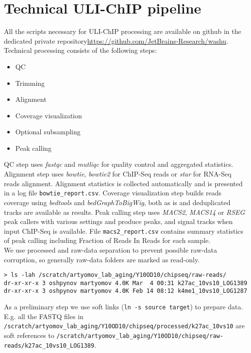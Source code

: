 \documentclass{article}
\begin{document}
\section{Technical ULI-ChIP pipeline}
All the scripts necessary for ULI-ChIP processing are available on github in the dedicated private repository\url{https://github.com/JetBrains-Research/washu}.\\ 
Technical processing consists of the following steps:
\begin{itemize}
\item QC
\item Trimming
\item Alignment
\item Coverage visualization
\item Optional subsampling
\item Peak calling
\end{itemize}
QC step uses \textit{fastqc} and \textit{mutliqc} for quality control and aggregated statistics. Alignment step uses \textit{bowtie}, \textit{bowtie2} for ChIP-Seq reads or \textit{star} for RNA-Seq reads alignment. Alignment statistics is collected automatically and is presented in a log file \texttt{bowtie\_report.csv}. Coverage visualization step builds reads coverage using \textit{bedtools} and \textit{bedGraphToBigWig}, both as is and deduplicated tracks are available as results. Peak calling step uses \textit{MACS2}, \textit{MACS14} or \textit{RSEG} peak callers with various settings and produce peaks, and signal tracks when input ChIP-Seq is available. File \texttt{macs2\_report.csv} contains summary statistics of peak calling including Fraction of Reads In Reads for each sample.\\ 

We use processed and raw-data separation to prevent possible raw-data corruption, so generally raw-data folders are marked as read-only.
\begin{lstlisting}
> ls -lah /scratch/artyomov_lab_aging/Y10OD10/chipseq/raw-reads/
dr-xr-xr-x 3 oshpynov martyomov 4.0K Mar  4 00:31 k27ac_10vs10_LOG1389
dr-xr-xr-x 3 oshpynov martyomov 4.0K Feb 14 08:12 k4me1_10vs10_LOG1287
\end{lstlisting}

As a preliminary step we use soft links (\texttt{ln -s source target}) to prepare data. E.g. all the FASTQ files in \texttt{/scratch/artyomov\_lab\_aging/Y10OD10/chipseq/processed/k27ac\_10vs10} are soft references to \texttt{/scratch/artyomov\_lab\_aging/Y10OD10/chipseq/raw-reads/k27ac\_10vs10\_LOG1389}.\\
\end{document}
